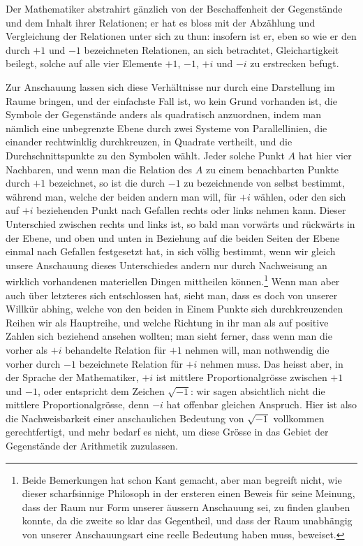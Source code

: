 \documentclass[12pt]{article}
\begin{document}
Der Mathematiker abstrahirt gänzlich von der Beschaffenheit der Gegenstände und dem Inhalt ihrer Relationen; er hat es bloss mit der Abzählung und Vergleichung der Relationen unter sich zu thun: insofern ist er, eben so wie er den durch $+1$ und $-1$ bezeichneten Relationen, an sich betrachtet, Gleichartigkeit beilegt, solche auf alle vier Elemente $+1$, $-1$, $+i$ und $-i$ zu erstrecken befugt.

Zur Anschauung lassen sich diese Verhältnisse nur durch eine Darstellung im Raume bringen, und der einfachste Fall ist, wo kein Grund vorhanden ist, die Symbole der Gegenstände anders als quadratisch anzuordnen, indem man nämlich eine unbegrenzte Ebene durch zwei Systeme von Parallellinien, die einander rechtwinklig durchkreuzen, in Quadrate vertheilt, und die Durchschnittspunkte zu den Symbolen wählt. Jeder solche Punkt $A$ hat hier vier Nachbaren, und wenn man die Relation des $A$ zu einem benachbarten Punkte durch $+1$ bezeichnet, so ist die durch $-1$ zu bezeichnende von selbst bestimmt, während man, welche der beiden andern man will, für $+i$ wählen, oder den sich auf $+i$ beziehenden Punkt nach Gefallen rechts oder links nehmen kann. Dieser Unterschied zwischen rechts und links ist, so bald man vorwärts und rückwärts in der Ebene, und oben und unten in Beziehung auf die beiden Seiten der Ebene einmal nach Gefallen festgesetzt hat, in sich völlig bestimmt, wenn wir gleich unsere Anschauung dieses Unterschiedes andern nur durch Nachweisung an wirklich vorhandenen materiellen Dingen mittheilen können.\footnote{Beide Bemerkungen hat schon Kant gemacht, aber man begreift nicht, wie dieser scharfsinnige Philosoph in der ersteren einen Beweis für seine Meinung, dass der Raum nur Form unserer äussern Anschauung sei, zu finden glauben konnte, da die zweite so klar das Gegentheil, und dass der Raum unabhängig von unserer Anschauungsart eine reelle Bedeutung haben muss, beweiset.} Wenn man aber auch über letzteres sich entschlossen hat, sieht man, dass es doch von unserer Willkür abhing, welche von den beiden in Einem Punkte sich durchkreuzenden Reihen wir als Hauptreihe, und welche Richtung in ihr man als auf positive Zahlen sich beziehend ansehen wollten; man sieht ferner, dass wenn man die vorher als $+i$ behandelte Relation für $+1$ nehmen will, man nothwendig die vorher durch $-1$ bezeichnete Relation für $+i$ nehmen muss. Das heisst aber, in der Sprache der Mathematiker, $+i$ ist mittlere Proportionalgrösse zwischen $+1$ und $-1$, oder entspricht dem Zeichen $\sqrt{-1}$: wir sagen absichtlich nicht die mittlere Proportionalgrösse, denn $-i$ hat offenbar gleichen Anspruch. Hier ist also die Nachweisbarkeit einer anschaulichen Bedeutung von $\sqrt{-1}$ vollkommen gerechtfertigt, und mehr bedarf es nicht, um diese Grösse in das Gebiet der Gegenstände der Arithmetik zuzulassen.
\end{document}
